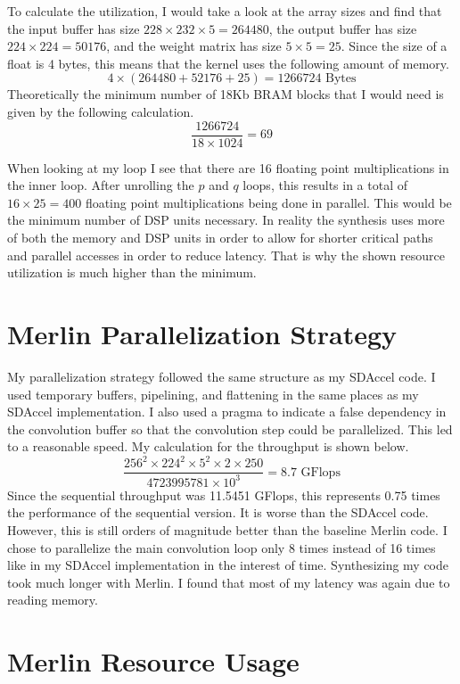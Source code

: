 \documentclass[12pt]{article}
\begin{document}
To calculate the utilization, I would take a look at the array sizes and find that the input buffer has size
\(228\times232\times5=264480\), the output buffer has size \(224\times 224=50176\), and the weight matrix has
size \(5\times 5=25\). Since the size of a float is 4 bytes, this means that the kernel uses the following amount
of memory.
\[4\times(264480+52176+25)=1266724 \text{ Bytes}\]
Theoretically the minimum number of 18Kb BRAM blocks that I would need is given by the following calculation.
\[\frac{1266724}{18\times1024}=69\]

When looking at my loop I see that there are 16 floating point multiplications in the inner loop. After unrolling
the \(p\) and \(q\) loops, this results in a total of \(16\times25=400\) floating point multiplications being done
in parallel. This would be the minimum number of DSP units necessary. In reality the synthesis uses more of both
the memory and DSP units in order to allow for shorter critical paths and parallel accesses in order to reduce latency.
That is why the shown resource utilization is much higher than the minimum.

\section{Merlin Parallelization Strategy}

My parallelization strategy followed the same structure as my SDAccel code. I used temporary buffers,
pipelining, and flattening in the same places as my SDAccel implementation. I also used a pragma to indicate
a false dependency in the convolution buffer so that the convolution step could be parallelized.
This led to a reasonable speed. My calculation for the throughput is shown below.
\[\frac{256^2\times 224^2\times 5^2\times 2\times 250}{4723995781\times 10^3}=8.7 \text{ GFlops}\]
Since the sequential throughput was 11.5451 GFlops, this represents 0.75 times the performance of the sequential
version. It is worse than the SDAccel code. However, this is still orders of magnitude better than the baseline
Merlin code. I chose to parallelize the main convolution loop only 8 times instead of 16 times like in my
SDAccel implementation in the interest of time. Synthesizing my code took much longer with Merlin. I found
that most of my latency was again due to reading memory.

\section{Merlin Resource Usage}
\end{document}
